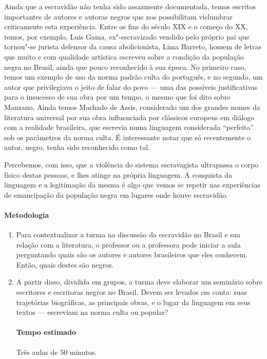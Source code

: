 \documentclass[11pt]{extarticle}
\begin{document}
\begin{enumerate}
\begin{enumerate}
Ainda que a escravidão não tenha sido assazmente documentada, temos escritos
importantes de autores e autoras negros que nos possibilitam vislumbrar criticamente
esta experiência. Entre os fins do século XIX e o começo do XX, temos, por exemplo, Luis
Gama, ex"-escravizado vendido pelo próprio pai que tornou"-se jurista
defensor da causa abolicionista, Lima Barreto, homem de letras que muito e com qualidade
artística escreveu sobre a condição da população negra no Brasil, ainda que pouco reconhecido
à sua época. No primeiro caso, temos um exemplo de uso da norma padrão culta do português,
e no segundo, um autor que privilegiava o jeito de falar do povo --- uma das possíveis
justificativas para o insucesso de sua obra por um tempo, o mesmo que foi
dito sobre Manzano. Ainda temos Machado de Assis, considerado um dos grandes nomes
da literatura universal por sua obra influenciada por clássicos europeus em diálogo
com a realidade brasileira, que escrevia numa linguagem considerada ``perfeita''
sob os parâmetros da norma culta. É interessante notar que só recentemente
o autor, negro, tenha sido reconhecido como tal. 

Percebemos, com isso, que a violência do sistema escravagista ultrapassa o corpo
físico destas pessoas, e lhes atinge na própria linguagem. A conquista da linguagem
e a legitimação da mesma é algo que vemos se repetir nas experiências de emancipação da
população negra em lugares onde houve escravidão.

\paragraph{Metodologia}

\begin{enumerate}
  \item
  Para contextualizar a turma na discussão da escravidão no Brasil e sua relação com
  a literatura, o professor ou a professora pode iniciar a aula perguntando 
  quais são os autores e autores brasileiros que eles conhecem. Então, quais destes
  são negros.

  \item
  A partir disso, dividida em grupos, a turma deve elaborar um seminário sobre escritores
  e escritoras negros no Brasil. Devem ser levados em conta: suas trajetórias biográficas,
  as principais obras, e o lugar da linguagem em seus textos --- escreviam na norma culta
  ou popular? 

  \paragraph{Tempo estimado} Três aulas de 50 minutos.


\end{enumerate}
\end{enumerate}
\end{enumerate}
\end{document}
